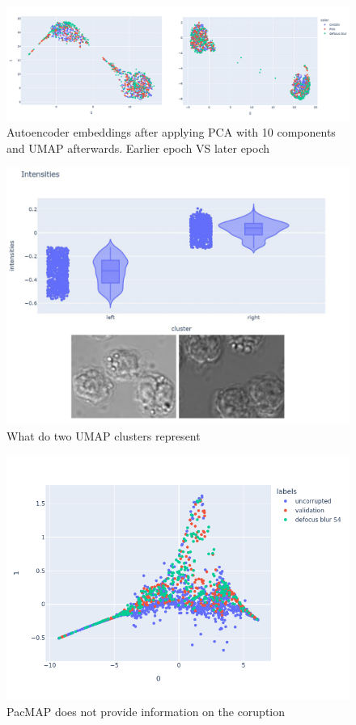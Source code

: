 \begin{figure}[htb]
	\begin{center}
		\includegraphics[width=0.5\linewidth]{bilder/ae-embeddings/pca-umap-clusters.png}
		\caption{Autoencoder embeddings after applying PCA with 10 components and UMAP afterwards. Earlier epoch VS later epoch}\label{fig:ae-pca-umap-clustered}
	\end{center}
\end{figure}

\begin{figure}[htb]
	\begin{center}
		\includegraphics[width=0.5\linewidth]{bilder/ae-embeddings/brighter-darker.png}
		\caption{What do two UMAP clusters represent}\label{fig:ae-brighter-darker}
	\end{center}
\end{figure}

\begin{figure}[htb]
	\begin{center}
		\includegraphics[width=0.5\linewidth]{bilder/ae-embeddings/pacmap.png}
		\caption{PacMAP does not provide information on the coruption}\label{fig:ae-pacmap}
	\end{center}
\end{figure}


